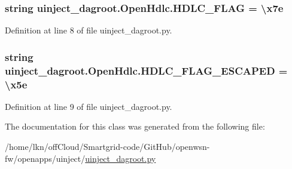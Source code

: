 \subsubsection[{\texorpdfstring{H\+D\+L\+C\+\_\+\+F\+L\+AG}{HDLC_FLAG}}]{\setlength{\rightskip}{0pt plus 5cm}string uinject\+\_\+dagroot.\+Open\+Hdlc.\+H\+D\+L\+C\+\_\+\+F\+L\+AG = \textquotesingle{}\textbackslash{}x7e\textquotesingle{}\hspace{0.3cm}{\ttfamily [static]}}\hypertarget{classuinject__dagroot_1_1_open_hdlc_a49aac6e146f8b58775baa2656ed3551a}{}\label{classuinject__dagroot_1_1_open_hdlc_a49aac6e146f8b58775baa2656ed3551a}


Definition at line 8 of file uinject\+\_\+dagroot.\+py.

\subsubsection[{\texorpdfstring{H\+D\+L\+C\+\_\+\+F\+L\+A\+G\+\_\+\+E\+S\+C\+A\+P\+ED}{HDLC_FLAG_ESCAPED}}]{\setlength{\rightskip}{0pt plus 5cm}string uinject\+\_\+dagroot.\+Open\+Hdlc.\+H\+D\+L\+C\+\_\+\+F\+L\+A\+G\+\_\+\+E\+S\+C\+A\+P\+ED = \textquotesingle{}\textbackslash{}x5e\textquotesingle{}\hspace{0.3cm}{\ttfamily [static]}}\hypertarget{classuinject__dagroot_1_1_open_hdlc_a5d91215ec60894c6cd7fc3063f9ce08b}{}\label{classuinject__dagroot_1_1_open_hdlc_a5d91215ec60894c6cd7fc3063f9ce08b}


Definition at line 9 of file uinject\+\_\+dagroot.\+py.



The documentation for this class was generated from the following file\+:\begin{DoxyCompactItemize}
\item 
/home/lkn/off\+Cloud/\+Smartgrid-\/code/\+Git\+Hub/openwsn-\/fw/openapps/uinject/\hyperlink{uinject__dagroot_8py}{uinject\+\_\+dagroot.\+py}\end{DoxyCompactItemize}
